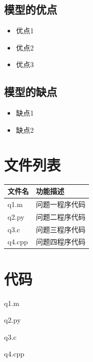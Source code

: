 \documentclass[withoutpreface,bwprint]{cumcmthesis}
\begin{document}
\subsection{模型的优点}
\begin{itemize}[itemindent=2em]
\item 优点1
\item 优点2
\item 优点3
\end{itemize}

\subsection{模型的缺点}
\begin{itemize}[itemindent=2em]
\item 缺点1
\item 缺点2
\end{itemize}

\nocite{*}

\newpage
\begin{appendices}
\section{文件列表}
\begin{table}[H]
\centering
\begin{tabularx}{\textwidth}{LL}
\toprule
文件名   & 功能描述 \\
\midrule
q1.m & 问题一程序代码 \\
q2.py & 问题二程序代码 \\
q3.c & 问题三程序代码 \\
q4.cpp & 问题四程序代码 \\
\bottomrule
\end{tabularx}
\label{tab:文件列表}
\end{table}

\section{代码}
\noindent q1.m

q2.py

q3.c

q4.cpp

\end{appendices}
\end{document}
